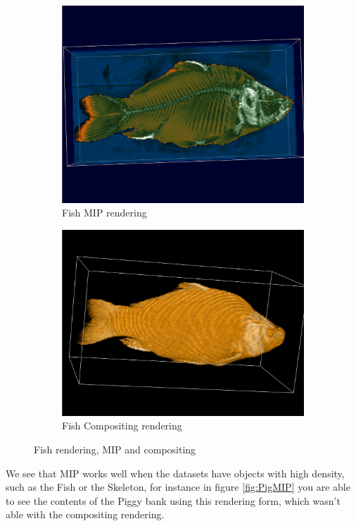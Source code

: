 \documentclass[a4paper,twoside,11pt]{article}
\begin{document}
\begin{figure}[h!]
    \begin{center}
        \begin{subfigure}[b]{0.47\textwidth}
            \includegraphics[width=\textwidth]{SanderImages/visMIPZ.png}
            \caption{Fish MIP rendering}
            \label{fig:FishMIP}
        \end{subfigure}
        \begin{subfigure}[b]{0.49\textwidth}
            \includegraphics[width=\textwidth]{SanderImages/FishCompZ.png}
            \caption{Fish Compositing rendering}
            \label{fig:FishComp}
        \end{subfigure}
        \caption{Fish rendering, MIP and compositing}
    \end{center}
\end{figure} \newline
We see that MIP works well when the datasets have objects with high density, such as the Fish or the Skeleton, for instance in figure \ref{fig:PigMIP} you are able to see the contents of the Piggy bank using this rendering form, which wasn't able with the compositing rendering.
\end{document}
